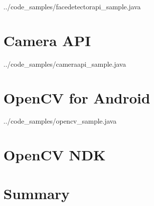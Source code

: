 
{../code_samples/facedetectorapi_sample.java}


\section{Camera API}


{../code_samples/cameraapi_sample.java}

\section{OpenCV for Android}


{../code_samples/opencv_sample.java}


\section{OpenCV NDK}

\section{Summary}
